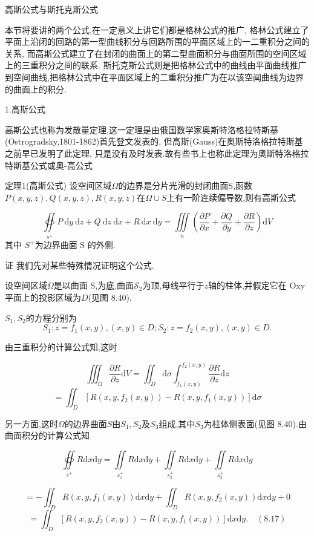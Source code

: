 \documentclass{article}
\begin{document}
高斯公式与斯托克斯公式

本节将要讲的两个公式,在一定意义上讲它们都是格林公式的推广,
格林公式建立了平面上沿闭的回路的第一型曲线积分与回路所围的平面区域上的一二重积分之间的关系,
而高斯公式建立了在封闭的曲面上的第二型曲面积分与曲面所围的空间区域上的三重积分之间的联系.
斯托克斯公式则是把格林公式中的曲线由平面曲线推广到空间曲线,把格林公式中在平面区域上的二重积分推广为在以该空闻曲线为边界的曲面上的积分.

1.高斯公式

高斯公式也称为发散量定理,这一定理是由俄国数学家奥斯特洛格拉特斯基(Ostrogradsky,1801-1862)首先登文发表的,
但高斯(Gauss)在奥斯特洛格拉特斯基之前早已发明了此定理,
只是没有及时发表.故有些书上也称此定理为奥斯特洛格拉特斯基公式或奥-高公式

定理1(高斯公式)
设空间区域$\Omega$的边界是分片光滑的封闭曲面S,函数 $P(x,y,z),Q(x,y,z),R(x,y,z)$在$\Omega\cup S$上有一阶连续偏导数,则有高斯公式

$$\oiint\limits_{s^+}P\:\mathrm{d}y\:\mathrm{d}z+Q\:\mathrm{d}z\:\mathrm{d}x+R\:\mathrm{d}x\:\mathrm{d}y=\iiint\limits_{n}\left(\frac{\partial P}{\partial x}+\frac{\partial Q}{\partial y}+\frac{\partial R}{\partial z}\right)\mathrm{d}V$$
其中 $S^+$为边界曲面 S 的外侧.

证 我们先对某些特殊情况证明这个公式.

设空间区域$\Omega$是以曲面 S,为底,曲面$\mathcal{S}_2$为顶,母线平行于$z$轴的柱体,并假定它在 Oxy 平面上的投影区域为$D$(见图 8.40),

$S_1,S_2$的方程分别为
$$S_1: z= f_1( x, y), ( x, y) \in D;S _2: z= f_2( x, y), ( x, y) \in D.$$

由三重积分的计算公式知,这时

$$\iiint_{\Omega}\frac{\partial R}{\partial z}\mathrm{d}V=\iint_D\mathrm{d}\sigma\int_{f_1(x,y)}^{f_2(x,y)}\frac{\partial R}{\partial z}\mathrm{d}z$$
$$=\iint_D\left[R\left(x,y,f_2(x,y)\right)-R\left(x,y,f_1(x,y)\right)\right]\mathrm{d}\sigma$$

另一方面,这时$\Omega$的边界曲面$S$由$S_1,S_2$及$S_3$组成,其中$S_3$为柱体侧表面(见图 8.40).由曲面积分的计算公式知

$$\underset{s^+}{\operatorname*{\operatorname*{\oiint}}}R\mathrm{d}x\mathrm{d}y=\underset{s_1^+}{\operatorname*{\operatorname*{\iint}}}R\mathrm{d}x\mathrm{d}y+\underset{s_2^+}{\operatorname*{\operatorname*{\iint}}}R\mathrm{d}x\mathrm{d}y+\underset{s_3^+}{\operatorname*{\operatorname*{\iint}}}R\mathrm{d}x\mathrm{d}y$$

$$=-\iint_DR\left(x,y,f_1\left(x,y\right)\right)\mathrm{d}x\mathrm{d}y+\iint_DR\left(x,y,f_2\left(x,y\right)\right)\mathrm{d}x\mathrm{d}y+0$$
$$=\iint_D\left[R\left(x,y,f_2\left(x,y\right)\right)-R\left(x,y,f_1\left(x,y\right)\right)\right]\mathrm{d}x\mathrm{d}y.\quad(8.17)$$
\end{document}
